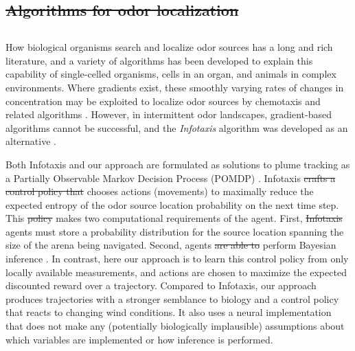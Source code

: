 \documentclass[5p,twocolumn,authoryear]{elsarticle}
\providecommand{\DIFaddtex}[1]{{\protect\color{blue}\uwave{#1}}} %
\providecommand{\DIFdeltex}[1]{{\protect\color{red}\sout{#1}}}                      %
\providecommand{\DIFaddbegin}{} %
\providecommand{\DIFaddend}{} %
\providecommand{\DIFdelbegin}{} %
\providecommand{\DIFdelend}{} %
\providecommand{\DIFadd}[1]{\texorpdfstring{\DIFaddtex{#1}}{#1}} %
\providecommand{\DIFdel}[1]{\texorpdfstring{\DIFdeltex{#1}}{}} %
\newcommand{\DIFscaledelfig}{0.5}
\newlength{\DIFdelgraphicswidth} %
\newlength{\DIFdelgraphicsheight} %
\newcommand{\DIFaddincludegraphics}[2][]{{\color{blue}\fbox{\DIFOincludegraphics[#1]{#2}}}} %
\newcommand{\DIFdelincludegraphics}[2][]{%
\sbox{\DIFdelgraphicsbox}{\DIFOincludegraphics[#1]{#2}}%
\settoboxwidth{\DIFdelgraphicswidth}{\DIFdelgraphicsbox} %
\settoboxtotalheight{\DIFdelgraphicsheight}{\DIFdelgraphicsbox} %
\scalebox{\DIFscaledelfig}{%
\parbox[b]{\DIFdelgraphicswidth}{\usebox{\DIFdelgraphicsbox}\\[-\baselineskip] \rule{\DIFdelgraphicswidth}{0em}}\llap{\resizebox{\DIFdelgraphicswidth}{\DIFdelgraphicsheight}{%
\setlength{\unitlength}{\DIFdelgraphicswidth}%
\begin{picture}(1,1)%
\thicklines\linethickness{2pt} %
{\color[rgb]{1,0,0}\put(0,0){\framebox(1,1){}}}%
{\color[rgb]{1,0,0}\put(0,0){\line( 1,1){1}}}%
{\color[rgb]{1,0,0}\put(0,1){\line(1,-1){1}}}%
\end{picture}%
}\hspace*{3pt}}} %
} %
\DeclareRobustCommand{\DIFaddbegin}{\DIFOaddbegin \let\includegraphics\DIFaddincludegraphics} %
\DeclareRobustCommand{\DIFaddend}{\DIFOaddend \let\includegraphics\DIFOincludegraphics} %
\DeclareRobustCommand{\DIFdelbegin}{\DIFOdelbegin \let\includegraphics\DIFdelincludegraphics} %
\DeclareRobustCommand{\DIFdelend}{\DIFOaddend \let\includegraphics\DIFOincludegraphics} %
\begin{document}
\DIFdelbegin \subsection{\DIFdel{Algorithms for odor localization}}
\addtocounter{subsection}{-1}%
\DIFdelend \DIFaddbegin \subsection*{\DIFadd{Algorithms for odor localization}}
\DIFaddend How biological organisms search and localize odor sources has a long and rich literature, and a variety of algorithms has been developed to explain this capability of single-celled organisms, cells in an organ, and animals in complex environments.
Where gradients exist, these smoothly varying rates of changes in concentration may be exploited to localize odor sources by chemotaxis and related algorithms \citep{adler1966chemotaxis,friedrich2007chemotaxis,cremer2019chemotaxis}.
However, in intermittent odor landscapes, gradient-based algorithms cannot be successful, and the \emph{Infotaxis} algorithm was developed as an alternative \citep{balkovsky2002olfactory,vergassola2007infotaxis,masson2009chasing,barbieri2011trajectories,calhoun2014maximally}. 

Both Infotaxis \citep{vergassola2007infotaxis} and our approach are formulated as solutions to plume tracking as a Partially Observable Markov Decision Process (POMDP) \citep{sutton2018reinforcement}. 
Infotaxis \DIFdelbegin \DIFdel{crafts a control policy that }\DIFdelend chooses actions (movements) to maximally reduce the expected entropy of the odor source location probability on the next time step.
This \DIFdelbegin \DIFdel{policy }\DIFdelend makes two computational requirements of the agent.
First, \DIFdelbegin \DIFdel{Infotaxis }\DIFdelend agents must store a probability distribution for the source location spanning the size of the arena being navigated.
Second, agents \DIFdelbegin \DIFdel{are able to }\DIFdelend \DIFaddbegin \DIFadd{must }\DIFaddend perform Bayesian inference \citep{reddyannrev}.
In contrast, here our approach is to learn this control policy from only locally available measurements, and actions are chosen to maximize the expected discounted reward over a trajectory.
Compared to Infotaxis, our approach produces trajectories with a stronger semblance to biology and a control policy that reacts to changing wind conditions.
It also uses a neural implementation that does not make any (potentially biologically implausible) assumptions about which variables are implemented or how inference is performed.
\end{document}
